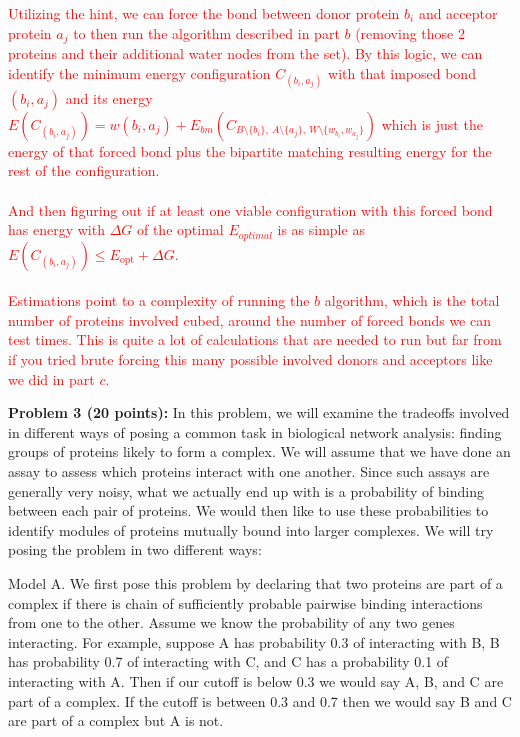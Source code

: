 \documentclass[11pt]{article}
\begin{document}
\textcolor{red}{
Utilizing the hint, we can force the bond between donor protein $b_i$ and acceptor protein $a_j$ to then run the algorithm described in part $b$ (removing those 2 proteins and their additional water nodes from the set). By this logic, we can identify the minimum energy configuration $C_{(b_i, a_j)}$ with that imposed bond $(b_i, a_j)$ and its energy $E(C_{(b_i, a_j)}) = w(b_i, a_j) + E_{bm}(C_{B \setminus \{b_i\},\ A \setminus \{a_j\},\ W \setminus \{w_{b_i}, w_{a_j}\}})$ which is just the energy of that forced bond plus the bipartite matching resulting energy for the rest of the configuration.\\\\
And then figuring out if at least one viable configuration with this forced bond has energy with $\Delta G$ of the optimal $E_{optimal}$ is as simple as $E(C_{(b_i, a_j)}) \le E_{\text{opt}} + \Delta G$.\\\\
Estimations point to a complexity of running the $b$ algorithm, which is the total number of proteins involved cubed, around the number of forced bonds we can test times. This is quite a lot of calculations that are needed to run but far from if you tried brute forcing this many possible involved donors and acceptors like we did in part $c$.
}

{\bf Problem 3 (20 points):} In this problem, we will examine the
tradeoffs involved in different ways of posing a common task in
biological network analysis: finding groups of proteins likely to form a complex.  We will assume that we have done an assay to assess which
proteins interact with one another.  Since such assays are generally very
noisy, what we actually end up with is a probability of binding
between each pair of proteins.  We would then like to use these
probabilities to identify modules of proteins mutually bound into larger
complexes.  We will try posing
the problem in two different ways:

Model A.  We first pose this problem by declaring that two proteins are
part of a complex if there is chain of sufficiently probable pairwise binding interactions from one to the other.  Assume we know the probability of any two genes interacting.  For example, suppose A has probability 0.3 of interacting with B, B has probability 0.7 of interacting with C, and C has a probability 0.1 of interacting with A.  Then if our cutoff is below 0.3 we would say A, B, and C are part of a complex.  If the cutoff is between 0.3 and 0.7 then we would say B and C are part of a complex but A is not.
\end{document}
